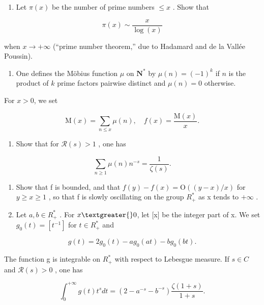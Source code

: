 \begin{enumerate}
\def\labelenumi{\alph{enumi})}
\setcounter{enumi}{2}
\tightlist
\item
  Let \(\pi(x)\) be the number of prime numbers \(\leqslant x\) . Show that
\end{enumerate}

\[
\pi (x) \sim \frac {x}{\log (x)}
\]

when \(x \to +\infty\) (“prime number theorem,” due to Hadamard and de la Vallée Poussin).

\begin{enumerate}
\def\labelenumi{\arabic{enumi})}
\setcounter{enumi}{10}
\tightlist
\item
  One defines the Möbius function \(\mu\) on \(\mathbf{N}^*\) by \(\mu(n) = (-1)^k\) if \(n\) is the product of \(k\) prime factors pairwise distinct and \(\mu(n) = 0\) otherwise.
\end{enumerate}

For \(x > 0\), we set

\[
\mathrm{M} (x) = \sum_ {n \leqslant x} \mu (n), \quad f (x) = \frac {\mathrm{M} (x)}{x}.
\]

\begin{enumerate}
\def\labelenumi{\alph{enumi})}
\tightlist
\item
  Show that for \(\mathcal{R}(s) > 1\) , one has
\end{enumerate}

\[
\sum_ {n \geqslant 1} \mu (n) n ^ {- s} = \frac {1}{\zeta (s)}.
\]

\begin{enumerate}
\def\labelenumi{\alph{enumi})}
\setcounter{enumi}{1}
\item
  Show that f is bounded, and that \(f(y) - f(x) = \mathrm{O}((y - x)/x)\) for \(y \geqslant x \geqslant 1\) , so that f is slowly oscillating on the group \(R_{+}^{*}\) as x tends to \(+\infty\) .
\item
  Let \(a, b \in R_{+}^{*}\) . For \(x \textgreater{} 0\), let {[}x{]} be the integer part of x. We set \(g_{0}(t) = [t^{-1}]\) for \(t \in R_{+}^{*}\) and
\end{enumerate}

\[
g (t) = 2 g _ {0} (t) - a g _ {0} (a t) - b g _ {0} (b t).
\]

The function g is integrable on \(R_{+}^{*}\) with respect to Lebesgue measure. If \(s \in C\) and \(\mathcal{R}(s) > 0\) , one has

\[
\int_ {0} ^ {+ \infty} g (t) t ^ {s} d t = (2 - a ^ {- s} - b ^ {- s}) \frac {\zeta (1 + s)}{1 + s}.
\]

